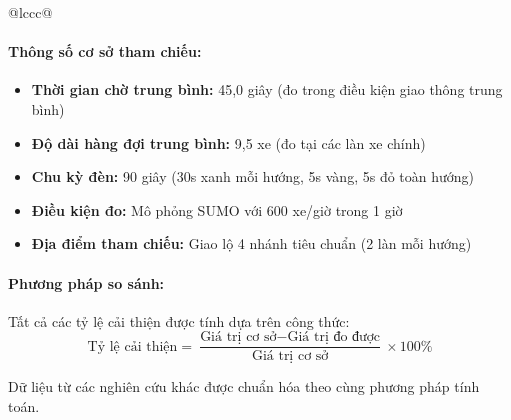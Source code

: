 \begin{table}[!htp]
\begin{tabular}{@{}lccc@{}}
\paragraph{Thông số cơ sở tham chiếu:}
\begin{itemize}
    \item \textbf{Thời gian chờ trung bình:} 45,0 giây (đo trong điều kiện giao thông trung bình)
    \item \textbf{Độ dài hàng đợi trung bình:} 9,5 xe (đo tại các làn xe chính)
    \item \textbf{Chu kỳ đèn:} 90 giây (30s xanh mỗi hướng, 5s vàng, 5s đỏ toàn hướng)
    \item \textbf{Điều kiện đo:} Mô phỏng SUMO với 600 xe/giờ trong 1 giờ
    \item \textbf{Địa điểm tham chiếu:} Giao lộ 4 nhánh tiêu chuẩn (2 làn mỗi hướng)
\end{itemize}

\paragraph{Phương pháp so sánh:}
Tất cả các tỷ lệ cải thiện được tính dựa trên công thức:
\begin{equation}
\text{Tỷ lệ cải thiện} = \frac{\text{Giá trị cơ sở} - \text{Giá trị đo được}}{\text{Giá trị cơ sở}} \times 100\%
\end{equation}

Dữ liệu từ các nghiên cứu khác được chuẩn hóa theo cùng phương pháp tính toán.

\begin{table}[!htp]
    \centering
    \caption{So sánh hiệu suất với các phương pháp điều khiển giao thông}
    \label{tab:final_comparison}
\end{table}
\end{tabular}
\end{table}
